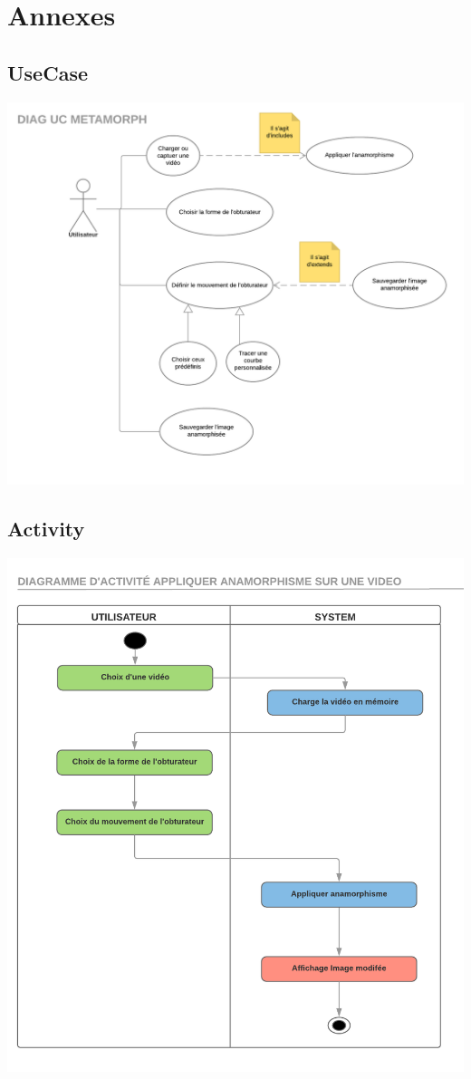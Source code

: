 \documentclass[a4paper,12pt]{report}
\begin{document}
\chapter{Annexes}
\section{UseCase}
\begin{center}
 \includegraphics[scale=0.65]{./UC.png}
\end{center}

\section{Activity}
\begin{center}
 \includegraphics[scale=0.7]{./Activites.png}
\end{center}
\end{document}
